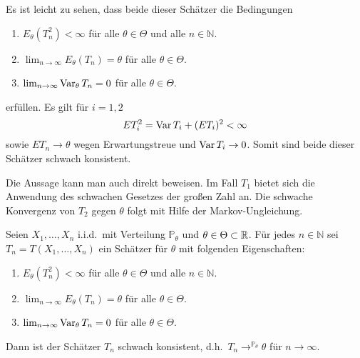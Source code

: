 

Es ist leicht zu sehen, dass beide dieser Schätzer
die Bedingungen 
\begin{enumerate}
    \item $E_\theta(T^2_n)< \infty$ für alle $\theta\in\Theta$ und alle $n\in\mathbb N$.
    \item $\lim_{n\to\infty}E_\theta(T_n) = \theta$ für alle $\theta\in\Theta$.
    \item $\lim_{n\to\infty} \operatorname{Var}_\theta T_n = 0$ für alle $\theta\in\Theta$.
\end{enumerate}
erfüllen. Es gilt für $i=1,2$
\begin{equation*}
    E T_i^2 = \operatorname{Var} T_i + (E T_i)^2 <\infty
\end{equation*}
sowie $E T_n \to \theta$ wegen Erwartungstreue und $\operatorname{Var} T_i \to 0$. Somit sind beide dieser
Schätzer schwach konsistent.

Die Aussage kann man auch direkt beweisen. Im Fall $T_1$ bietet sich die Anwendung
des schwachen Gesetzes der großen Zahl an. Die schwache Konvergenz von $T_2$ gegen $\theta$ 
folgt mit Hilfe der Markov-Ungleichung.





\label{Konsistenz-Hinreichende-Bedingungen}
Seien $X_1,\ldots,X_n$ i.i.d.\ mit Verteilung $\mathbb P_\theta$ und $\theta\in\Theta\subset\mathbb R$.
Für jedes $n\in\mathbb N$ sei $T_n = T(X_1,\ldots,X_n)$ ein Schätzer für $\theta$ mit 
folgenden Eigenschaften:
\begin{enumerate}
    \item $E_\theta(T^2_n)< \infty$ für alle $\theta\in\Theta$ und alle $n\in\mathbb N$.
    \item $\lim_{n\to\infty}E_\theta(T_n) = \theta$ für alle $\theta\in\Theta$.
    \item $\lim_{n\to\infty} \operatorname{Var}_\theta T_n = 0$ für alle $\theta\in\Theta$.
\end{enumerate}
Dann ist der Schätzer $T_n$ schwach konsistent, d.h.\ $T_n \to^{\mathbb P_\theta} \theta$
für $n\to\infty$.


